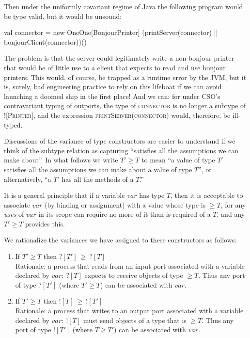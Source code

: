 \documentclass[12pt]{IOS-Book-Article-CPA-2017}
\begin{document}
Then under the uniformly covariant regime of Java the following program would be
type valid, but it would be unsound:
\begin{code}
        val connector = new OneOne[BonjourPrinter]
        (printServer(connector) || bonjourClient(connector))()
\end{code}
The problem is that the server could legitimately write a non-bonjour
printer that would be of little use to a client that expects to read and use
bonjour printers. This would, of course, be trapped as a runtime
error by the JVM, but it is, surely, bad engineering practice
to rely on this lifeboat if we can avoid launching a doomed ship
in the first place!  
% 
And we can: for under CSO's contravariant typing of outports, the
type of \textsc{connector} is no longer a subtype of \textsc{![Printer]},
and the expression \textsc{printServer(connector)} would, therefore,
be ill-typed.



Discussions of the variance of type constructors are easier to understand
if we think of the subtype relation as capturing ``satisfies all
the assumptions we can make about''. In what follows we write $T'\ge
T$ to mean ``a value of type $T'$ satisfies all the assumptions we
can make about a value of type $T$'', or alternatively, ``a $T'$ has
all the methods of a $T$.''

It is a general principle that if a variable $var$ has type $T$, then
it is acceptable to associate $var$ (by binding or assignment) with a 
value whose type is $\ge T$, for any \textit{uses} of $var$ in
its scope can require no more of it than is required of
a $T$, and any $T'\ge T$ provides this.

We rationalize the variances we have assigned to these constructors
as follows:
\begin{enumerate}
\item If $T'\ge T$ then $?[T']~\ge~?[T]$ 
\\Rationale: a process that reads from an input port associated with a
variable declared by $var:~?[T]$ expects to receive objects of type $\ge
T$. Thus any port of type $?[T']$ (where $T'\ge T$) can be associated
with $var$.


\item If $T'\ge T$ then $![T]~\ge~![T']$ 
\\Rationale: a process that writes to an output port associated with
a variable declared by $var:~![T]$ must send objects of a type 
that is $\ge T$. Thus any port of type $![T']$ (where $T \ge T'$) 
can be associated with $var$.

\end{enumerate}
\end{document}
